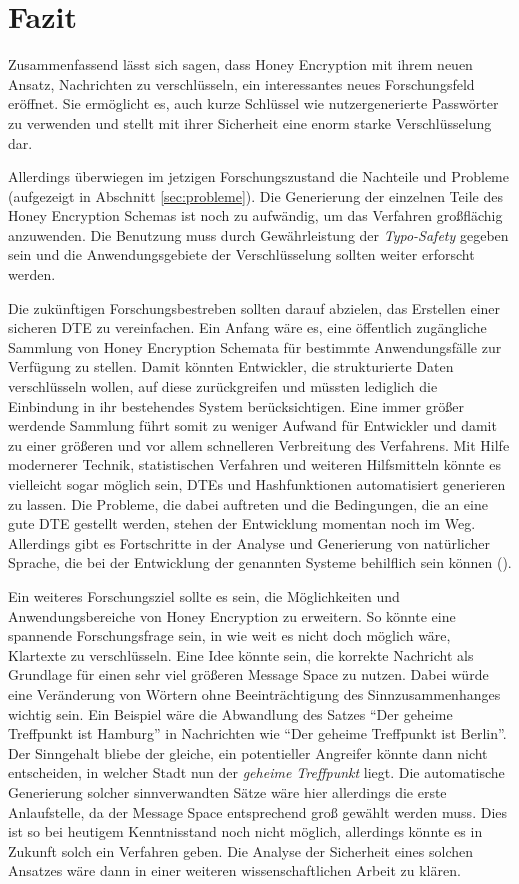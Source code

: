 \documentclass[12pt]{scrartcl}
\begin{document}
\newpage
\section{Fazit}
\label{sec:fazit}
Zusammenfassend lässt sich sagen, dass Honey Encryption mit ihrem neuen Ansatz, Nachrichten zu verschlüsseln, ein interessantes neues Forschungsfeld eröffnet. Sie ermöglicht es, auch kurze Schlüssel wie nutzergenerierte Passwörter zu verwenden und stellt mit ihrer Sicherheit eine enorm starke Verschlüsselung dar.

Allerdings überwiegen im jetzigen Forschungszustand die Nachteile und Probleme (aufgezeigt in Abschnitt \ref{sec:probleme}). Die Generierung der einzelnen Teile des Honey Encryption Schemas ist noch zu aufwändig, um das Verfahren großflächig anzuwenden. Die Benutzung muss durch Gewährleistung der \emph{Typo-Safety} gegeben sein und die Anwendungsgebiete der Verschlüsselung sollten weiter erforscht werden.

Die zukünftigen Forschungsbestreben sollten darauf abzielen, das Erstellen einer sicheren DTE zu vereinfachen. Ein Anfang wäre es, eine öffentlich zugängliche Sammlung von Honey Encryption Schemata für bestimmte Anwendungsfälle zur Verfügung zu stellen. Damit könnten Entwickler, die strukturierte Daten verschlüsseln wollen, auf diese zurückgreifen und müssten lediglich die Einbindung in ihr bestehendes System berücksichtigen. Eine immer größer werdende Sammlung führt somit zu weniger Aufwand für Entwickler und damit zu einer größeren und vor allem schnelleren Verbreitung des Verfahrens. Mit Hilfe modernerer Technik, statistischen Verfahren und weiteren Hilfsmitteln könnte es vielleicht sogar möglich sein, DTEs und Hashfunktionen automatisiert generieren zu lassen. Die Probleme, die dabei auftreten und die Bedingungen, die an eine gute DTE gestellt werden, stehen der Entwicklung momentan noch im Weg. Allerdings gibt es Fortschritte in der Analyse und Generierung von natürlicher Sprache, die bei der Entwicklung der genannten Systeme behilflich sein können (\cite{CRCS2014}).

Ein weiteres Forschungsziel sollte es sein, die Möglichkeiten und Anwendungsbereiche von Honey Encryption zu erweitern. So könnte eine spannende Forschungsfrage sein, in wie weit es nicht doch möglich wäre, Klartexte zu verschlüsseln. Eine Idee könnte sein, die korrekte Nachricht als Grundlage für einen sehr viel größeren Message Space zu nutzen. Dabei würde eine Veränderung von Wörtern ohne Beeinträchtigung des Sinnzusammenhanges wichtig sein. Ein Beispiel wäre die Abwandlung des Satzes ``Der geheime Treffpunkt ist Hamburg'' in Nachrichten wie ``Der geheime Treffpunkt ist Berlin''. Der Sinngehalt bliebe der gleiche, ein potentieller Angreifer könnte dann nicht entscheiden, in welcher Stadt nun der \emph{geheime Treffpunkt} liegt. Die automatische Generierung solcher sinnverwandten Sätze wäre hier allerdings die erste Anlaufstelle, da der Message Space entsprechend groß gewählt werden muss. Dies ist so bei heutigem Kenntnisstand noch nicht möglich, allerdings könnte es in Zukunft solch ein Verfahren geben. Die Analyse der Sicherheit eines solchen Ansatzes wäre dann in einer weiteren wissenschaftlichen Arbeit zu klären.
\end{document}
